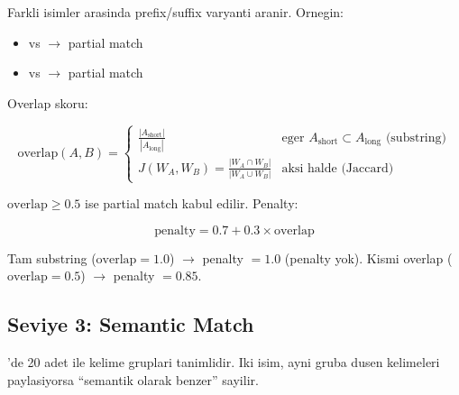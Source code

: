 Farkli isimler arasinda prefix/suffix varyanti aranir. Ornegin:
\begin{itemize}
\item {} vs  $\to$ partial match
\item {} vs  $\to$ partial match
\end{itemize}

Overlap skoru:

\begin{equation}
\text{overlap}(A, B) = \begin{cases}
\frac{|A_{\text{short}}|}{|A_{\text{long}}|} & \text{eger } A_{\text{short}} \subset A_{\text{long}} \text{ (substring)} \\[6pt]
J(W_A, W_B) = \frac{|W_A \cap W_B|}{|W_A \cup W_B|} & \text{aksi halde (Jaccard)}
\end{cases}
\label{eq:overlap}
\end{equation}

$\text{overlap} \geq 0.5$ ise partial match kabul edilir. Penalty:

\begin{equation}
\text{penalty} = 0.7 + 0.3 \times \text{overlap}
\end{equation}

Tam substring ($\text{overlap} = 1.0$) $\to$ penalty $= 1.0$ (penalty yok). Kismi overlap ($\text{overlap} = 0.5$) $\to$ penalty $= 0.85$.


\subsection{Seviye 3: Semantic Match}

'de 20 adet  ile kelime gruplari tanimlidir. Iki isim, ayni gruba dusen kelimeleri paylasiyorsa ``semantik olarak benzer'' sayilir.

